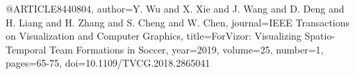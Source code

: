 @ARTICLE{8440804,
  author={Y. {Wu} and X. {Xie} and J. {Wang} and D. {Deng} and H. {Liang} and H. {Zhang} and S. {Cheng} and W. {Chen}},
  journal={IEEE Transactions on Visualization and Computer Graphics}, 
  title={ForVizor: Visualizing Spatio-Temporal Team Formations in Soccer}, 
  year={2019},
  volume={25},
  number={1},
  pages={65-75},
  doi={10.1109/TVCG.2018.2865041}}